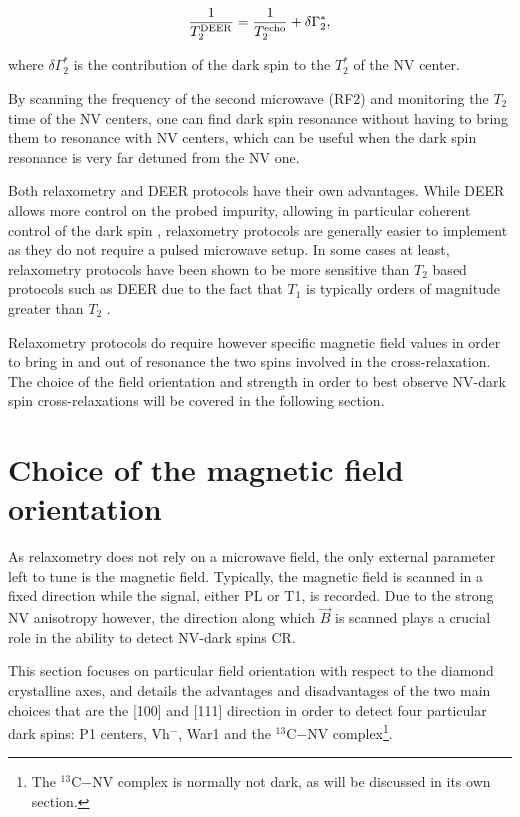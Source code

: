 \documentclass[a4paper, 11pt]{report}
\begin{document}
\begin{equation}
\frac{1}{T_2^{\rm DEER}}=\frac{1}{T_2^{\rm echo}} + \delta \Gamma_2^*,
\end{equation}

where $\delta \Gamma_2^*$ is the contribution of the dark spin to the $T_2^*$ of the NV center.

By scanning the frequency of the second microwave (RF2) and monitoring the $T_2$ time of the NV centers, one can find dark spin resonance without having to bring them to resonance with NV centers, which can be useful when the dark spin resonance is very far detuned from the NV one.

Both relaxometry and DEER protocols have their own advantages. While DEER allows more control on the probed impurity, allowing in particular coherent control of the dark spin \citep{sushkov2014magnetic}, relaxometry protocols are generally easier to implement as they do not require a pulsed microwave setup. In some cases at least, relaxometry protocols have been shown to be more sensitive than $T_2$ based protocols such as DEER due to the fact that $T_1$ is typically orders of magnitude greater than $T_2$ \citep{steinert2013magnetic}.

Relaxometry protocols do require however specific magnetic field values in order to bring in and out of resonance the two spins involved in the cross-relaxation. The choice of the field orientation and strength in order to best observe NV-dark spin cross-relaxations will be covered in the following section.

\section{Choice of the magnetic field orientation}

As relaxometry does not rely on a microwave field, the only external parameter left to tune is the magnetic field. Typically, the magnetic field is scanned in a fixed direction while the signal, either PL or T1, is recorded. Due to the strong NV anisotropy however, the direction along which $\vec{B}$ is scanned plays a crucial role in the ability to detect NV-dark spins CR.

This section focuses on particular field orientation with respect to the diamond crystalline axes, and details the advantages and disadvantages of the two main choices that are the [100] and [111] direction in order to detect four particular dark spins: P1 centers, Vh$^-$, War1 and the $^{13}$C$-$NV complex\footnote{The $^{13}$C$-$NV complex is normally not dark, as will be discussed in its own section.}.
\end{document}
